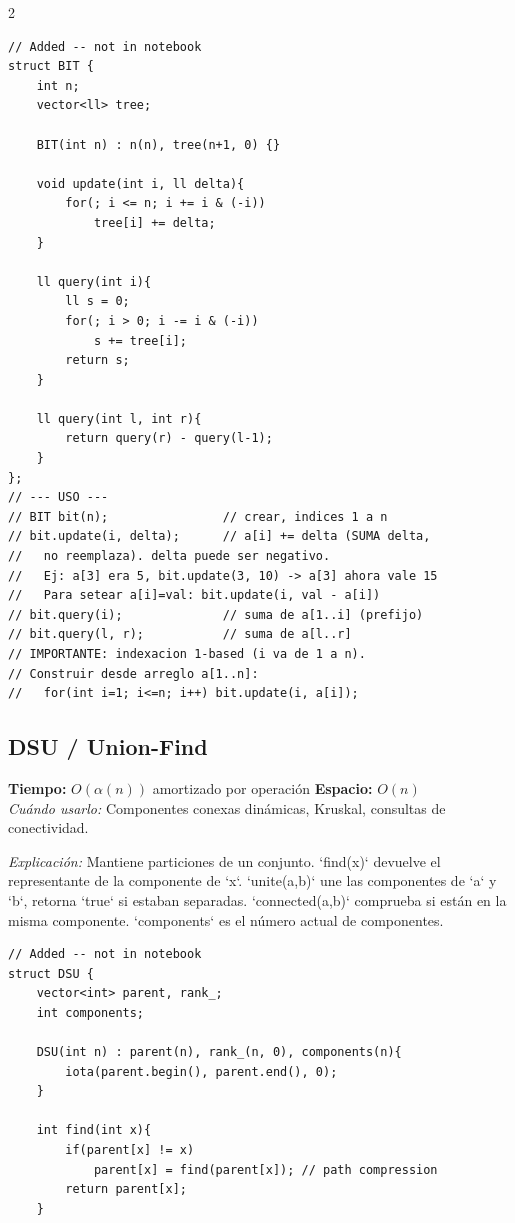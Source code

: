 \documentclass[10pt,a4paper]{article}
\begin{document}
\begin{multicols}{2}
\begin{lstlisting}
// Added -- not in notebook
struct BIT {
    int n;
    vector<ll> tree;

    BIT(int n) : n(n), tree(n+1, 0) {}

    void update(int i, ll delta){
        for(; i <= n; i += i & (-i))
            tree[i] += delta;
    }

    ll query(int i){
        ll s = 0;
        for(; i > 0; i -= i & (-i))
            s += tree[i];
        return s;
    }

    ll query(int l, int r){
        return query(r) - query(l-1);
    }
};
// --- USO ---
// BIT bit(n);                // crear, indices 1 a n
// bit.update(i, delta);      // a[i] += delta (SUMA delta,
//   no reemplaza). delta puede ser negativo.
//   Ej: a[3] era 5, bit.update(3, 10) -> a[3] ahora vale 15
//   Para setear a[i]=val: bit.update(i, val - a[i])
// bit.query(i);              // suma de a[1..i] (prefijo)
// bit.query(l, r);           // suma de a[l..r]
// IMPORTANTE: indexacion 1-based (i va de 1 a n).
// Construir desde arreglo a[1..n]:
//   for(int i=1; i<=n; i++) bit.update(i, a[i]);
\end{lstlisting}

\subsection{DSU / Union-Find}
\textbf{Tiempo:} $O(\alpha(n))$ amortizado por operaci\'on \quad \textbf{Espacio:} $O(n)$\\
\textit{Cu\'ando usarlo:} Componentes conexas din\'amicas, Kruskal, consultas de conectividad.

\textit{Explicación:} Mantiene particiones de un conjunto. `find(x)` devuelve el representante de la componente de `x`. `unite(a,b)` une las componentes de `a` y `b`, retorna `true` si estaban separadas. `connected(a,b)` comprueba si están en la misma componente. `components` es el número actual de componentes.

\begin{lstlisting}
// Added -- not in notebook
struct DSU {
    vector<int> parent, rank_;
    int components;

    DSU(int n) : parent(n), rank_(n, 0), components(n){
        iota(parent.begin(), parent.end(), 0);
    }

    int find(int x){
        if(parent[x] != x)
            parent[x] = find(parent[x]); // path compression
        return parent[x];
    }


\end{lstlisting}
\end{multicols}
\end{document}
